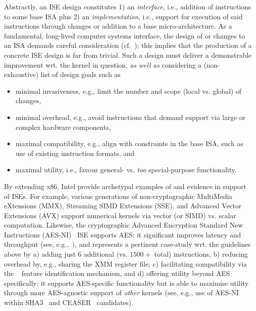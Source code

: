 Abstractly, an ISE design constitutes
1) an {\em interface},
   i.e., 
   addition of instructions to some 
   base ISA
   plus
2) an {\em implementation},
   i.e., 
   support for execution of said instructions through changes or addition 
   to a 
   base micro-architecture.
As a fundamental, long-lived computer systems interface, the design of or
changes to an ISA demands careful consideration
(cf.~\cite[Section 4]{Gueron:09}); this implies that the production of a 
concrete ISE design is far from trivial.  
Such a design must deliver a demonstrable improvement wrt. the kernel in 
question, {\em as well as} considering a (non-exhaustive) list of design 
goals such as

\begin{itemize}
\item minimal invasiveness,
      e.g.,
      limit the number and scope (local vs. global) of changes,
\item minimal overhead,
      e.g.,
      avoid instructions that demand support via large or complex hardware components,
\item maximal compatibility,
      e.g.,
      align with constraints in the base ISA, such as use of existing instruction formats,
      and
\item maximal       utility,
      i.e.,
      favour general- vs. {\em too} special-purpose functionality.
\end{itemize}

\noindent
By extending x86, Intel provide archetypal examples of and evidence in
support of ISEs.
For example, various generations of
non-cryptographic
MultiMedia      eXtensions (MMX),
Streaming SIMD  Extensions (SSE),
and
Advanced Vector Extensions (AVX)
support numerical kernels via vector (or SIMD) vs. scalar computation.  
Likewise, the
    cryptographic
Advanced Encryption Standard New Instructions (AES-NI)~\cite{Gueron:09,DruGueKra:19}
ISE
supports AES: it significant improves latency and throughput
(see, e.g.,~\cite{FazLopOli:18}),
and represents a pertinent case-study wrt. the guidelines above by
a) adding just $6$ additional (vs. $1500+$ total) instructions,
b) reducing overhead by, e.g., sharing the XMM register file,
c) facilitating compatibility via the
   ~\cite[Chapter 20]{X86:1:18}
   feature identification mechanism,
   and
d) offering utility beyond AES specifically:
   it supports AES-specific functionality but is able to maximise utility 
   through more AES-agnostic support of {\em other} kernels
   (see, e.g., use of AES-NI within SHA3~\cite{BBGR:09} and CEASER~\cite[Section 4.1]{AnkAnk:16} candidates).

